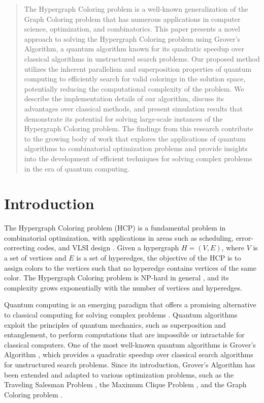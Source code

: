 \begin{abstract}
The Hypergraph Coloring problem is a well-known generalization of the Graph Coloring problem that has numerous applications in computer science, optimization, and combinatorics. This paper presents a novel approach to solving the Hypergraph Coloring problem using Grover's Algorithm, a quantum algorithm known for its quadratic speedup over classical algorithms in unstructured search problems. Our proposed method utilizes the inherent parallelism and superposition properties of quantum computing to efficiently search for valid colorings in the solution space, potentially reducing the computational complexity of the problem. We describe the implementation details of our algorithm, discuss its advantages over classical methods, and present simulation results that demonstrate its potential for solving large-scale instances of the Hypergraph Coloring problem. The findings from this research contribute to the growing body of work that explores the applications of quantum algorithms to combinatorial optimization problems and provide insights into the development of efficient techniques for solving complex problems in the era of quantum computing.

\end{abstract}

\section{Introduction}

The Hypergraph Coloring problem (HCP) is a fundamental problem in combinatorial optimization, with applications in areas such as scheduling, error-correcting codes, and VLSI design \cite{berge1989hypergraphs, lovász2009covering}. Given a hypergraph $H = (V, E)$, where $V$ is a set of vertices and $E$ is a set of hyperedges, the objective of the HCP is to assign colors to the vertices such that no hyperedge contains vertices of the same color. The Hypergraph Coloring problem is NP-hard in general \cite{garey1979computers}, and its complexity grows exponentially with the number of vertices and hyperedges.

Quantum computing is an emerging paradigm that offers a promising alternative to classical computing for solving complex problems \cite{nielsen2002quantum}. Quantum algorithms exploit the principles of quantum mechanics, such as superposition and entanglement, to perform computations that are impossible or intractable for classical computers. One of the most well-known quantum algorithms is Grover's Algorithm \cite{grover1996fast}, which provides a quadratic speedup over classical search algorithms for unstructured search problems. Since its introduction, Grover's Algorithm has been extended and adapted to various optimization problems, such as the Traveling Salesman Problem \cite{zalka1999solving}, the Maximum Clique Problem \cite{park2006solving}, and the Graph Coloring problem \cite{childs2000quantum}.

